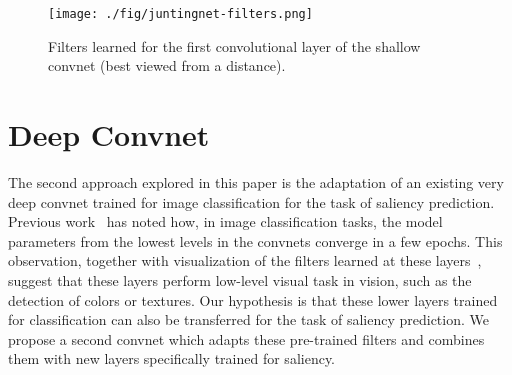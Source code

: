 \documentclass[10pt,twocolumn,letterpaper]{article}
\begin{document}
\begin{figure}
  \centering
  \texttt{[image: ./fig/juntingnet-filters.png]}
  \caption{Filters learned for the first convolutional layer of the shallow convnet (best viewed from a distance).}
  \label{fig:juntingnet-filters}
\end{figure}%
\section{Deep Convnet}\label{sec:SalNet}

The second approach explored in this paper is the adaptation of an existing very deep convnet trained for image classification for the task of saliency prediction.
Previous work~\cite{zeiler2014visualizing} has noted how, in image classification tasks, the model parameters from the lowest levels in the convnets converge in a few epochs.
This observation, together with visualization of the filters learned at these layers~\cite{simonyan2013deep}, suggest that these layers perform low-level visual task in vision, such as the detection of colors or textures.
Our hypothesis is that these lower layers trained for classification can also be transferred for the task of saliency prediction.
We propose a second convnet which adapts these pre-trained filters and combines them with new layers specifically trained for saliency.
\end{document}
